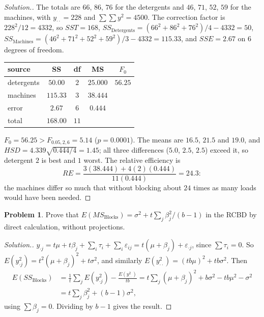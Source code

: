 \documentclass[11pt,a4paper]{article}
\numberwithin{equation}{section}
\theoremstyle{definition}
\newtheorem{problemx}{Problem}[subsection]
\newenvironment{problem}{\begin{problemx}}{\end{problemx}}
\newenvironment{solution}
  {\renewcommand{\qedsymbol}{}\begin{proof}[\textit{Solution}.]}
  {\end{proof}}
\begin{document}
\begin{solution}
The totals are $66$, $86$, $76$ for the detergents and $46$, $71$, $52$, $59$ for the machines, with $y_{\cdot\cdot} = 228$ and $\sum\sum y^2 = 4500$. The correction factor is
$228^2/12 = 4332$, so $SST = 168$, $SS_{\mathrm{Detergents}} = (66^2 + 86^2 + 76^2)/4 - 4332 = 50$, $SS_{\mathrm{Machines}} = (46^2 + 71^2 + 52^2 + 59^2)/3 - 4332 = 115.33$, and $SSE = 2.67$
on $6$ degrees of freedom.
\begin{center}
\begin{tabular}{l|c|c|c|c}
source & SS & df & MS & $F_0$ \\
\hline
detergents & $50.00$ & $2$ & $25.000$ & $56.25$ \\
machines & $115.33$ & $3$ & $38.444$ & \\
error & $2.67$ & $6$ & $0.444$ & \\
\hline
total & $168.00$ & $11$ & &
\end{tabular}
\end{center}
$F_0 = 56.25 > F_{0.05,2,6} = 5.14$ ($p = 0.0001$). The means are $16.5$, $21.5$ and $19.0$, and $HSD = 4.339\sqrt{0.444/4} = 1.45$; all three differences ($5.0$, $2.5$, $2.5$)
exceed it, so detergent $2$ is best and $1$ worst. The relative efficiency is
\[
RE = \frac{3(38.444) + 4(2)(0.444)}{11(0.444)} = 24.3 :
\]
the machines differ so much that without blocking about $24$ times as many loads would have been needed.
\end{solution}

\begin{problem}
Prove that $E(MS_{\mathrm{Blocks}}) = \sigma^2 + t\sum_j\beta_j^2/(b - 1)$ in the RCBD by direct calculation, without projections.
\end{problem}

\begin{solution}
$y_{\cdot j} = t\mu + t\beta_j + \sum_i\tau_i + \sum_i\varepsilon_{ij} = t(\mu + \beta_j) + \varepsilon_{\cdot j}$, since $\sum\tau_i = 0$. So $E(y_{\cdot j}^2) = t^2(\mu + \beta_j)^2 + t\sigma^2$, and similarly
$E(y_{\cdot\cdot}^2) = (tb\mu)^2 + tb\sigma^2$. Then
\begin{align*}
E(SS_{\mathrm{Blocks}}) &= \frac1t\sum_jE(y_{\cdot j}^2) - \frac{E(y_{\cdot\cdot}^2)}{tb} = t\sum_j(\mu + \beta_j)^2 + b\sigma^2 - tb\mu^2 - \sigma^2 \\
&= t\sum_j\beta_j^2 + (b - 1)\sigma^2 ,
\end{align*}
using $\sum\beta_j = 0$. Dividing by $b - 1$ gives the result.
\end{solution}
\end{document}

